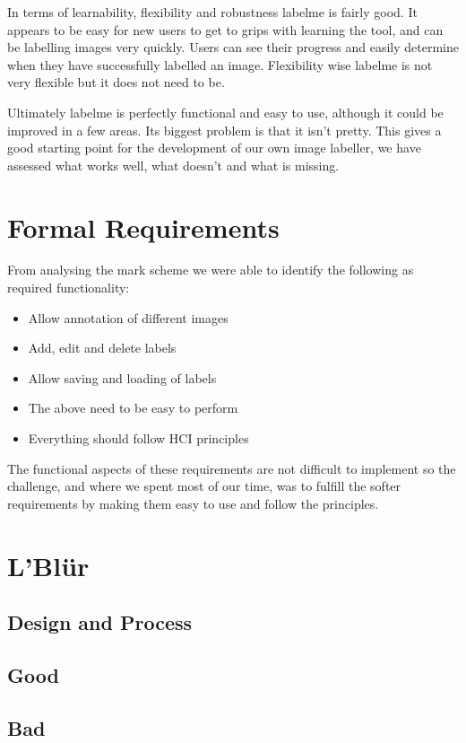 \documentclass[a4paper,11pt,oneside]{article}
\begin{document}
In terms of learnability, flexibility and robustness labelme is fairly good.  It appears to be easy for new users to get to grips with learning the tool, and can be labelling images very quickly.  Users can see their progress and easily determine when they have successfully labelled an image.  Flexibility wise labelme is not very flexible but it does not need to be.

Ultimately labelme is perfectly functional and easy to use, although it could be improved in a few areas.  Its biggest problem is that it isn't pretty.  This gives a good starting point for the development of our own image labeller, we have assessed what works well, what doesn't and what is missing.

\section{Formal Requirements}

From analysing the mark scheme we were able to identify the following as required functionality:
\begin{itemize}
\item Allow annotation of different images
\item Add, edit and delete labels
\item Allow saving and loading of labels
\item The above need to be easy to perform
\item Everything should follow HCI principles
\end{itemize}
The functional aspects of these requirements are not difficult to implement so the challenge, and where we spent most of our time, was to fulfill the softer requirements by making them easy to use and follow the principles.

\section{L'Bl\"{u}r}

\subsection{Design and Process}

\subsection{Good}

\subsection{Bad}
\end{document}
